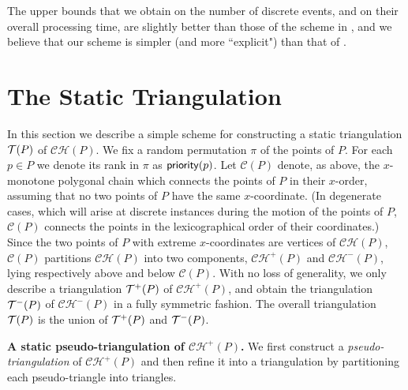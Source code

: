 \documentclass[11pt]{article}
\def\CH{{\mathcal{CH}}}
\def\T{{\cal T}}
\def\prior{{\sf priority}}
\def\C{\mathcal{C}}
\begin{document}
The upper bounds that we obtain on the number of discrete events, and on their overall processing time, are slightly better than those of the scheme in \cite{AWY}, and we believe that our scheme is simpler (and more ``explicit") than that of \cite{AWY}.
\section{The Static Triangulation}\label{Sect:Static}
In this section we describe a simple scheme for constructing a static triangulation $\T(P)$ of $\CH(P)$.
We fix a random permutation $\pi$ of the points of $P$.  For each
$p\in P$ we denote its rank in $\pi$ as $\prior(p)$.  Let $\C(P)$
denote, as above, the $x$-monotone polygonal chain which connects the points of
$P$ in their $x$-order, assuming that no two points of $P$ have the
same $x$-coordinate. (In degenerate cases, which will arise at
discrete instances during the motion of the points of $P$, $\C(P)$
connects the points in the lexicographical order of their
coordinates.)  Since the two points of $P$ with extreme
$x$-coordinates are vertices of $\CH(P)$, $\C(P)$ partitions $\CH(P)$
into two components, $\CH^+(P)$ and $\CH^-(P)$, lying respectively
above and below $\C(P)$. With no loss of generality, we only describe
a triangulation $\T^+(P)$ of $\CH^+(P)$, and obtain the triangulation
$\T^-(P)$ of $\CH^-(P)$ in a fully symmetric fashion.  The overall
triangulation $\T(P)$ is the union of $\T^+(P)$ and $\T^-(P)$.


\medskip
\noindent
{\bf A static pseudo-triangulation of $\CH^+(P)$.}
We first construct a \textit{pseudo-triangulation} of $\CH^+(P)$ and
then refine it into a triangulation by partitioning each
pseudo-triangle into triangles.
\end{document}
